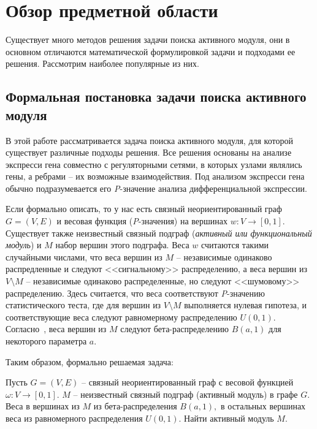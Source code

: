 \chapter{Обзор предметной области}
\label{section_module}

Существует много методов решения задачи поиска активного модуля, они в основном
отличаются математической формулировкой задачи и подходами ее решения.
Рассмотрим наиболее популярные из них.





\section{Формальная постановка задачи поиска активного модуля}

В этой работе рассматривается задача поиска активного модуля, для которой
существует различные подходы решения.  Все решения основаны на анализе
экспресси гена совместно с регуляторными сетями, в которых узлами являлись
гены, а ребрами -- их возможные взаимодействия. Под анализом экспресси гена
обычно подразумевается его \emph{P}-значение анализа дифференциальной
экспрессии.

Если формально описать, то у нас есть связный неориентированный граф $G = (V,
E)$ и весовая функция (\emph{P}-значения) на вершинах $w: V \to [0, 1]$.
Существует также неизвестный связный подграф (\emph{активный или функциональный
модуль}) и $M$ набор вершин этого подграфа.  Веса $w$ считаются такими
случайными числами, что веса вершин из $M$ -- независимые одинаково
распредленные и следуют <<сигнальному>> распределению, а веса вершин из $V
\setminus M$ -- независимые одинаково распределенные, но следуют <<шумовому>>
распределению.  Здесь считается, что веса соответствуют \emph{P}-значению
статистического теста, где для вершин из $V \setminus M$ выполняется нулевая
гипотеза, и соответствующие веса следуют равномерному распределению $U(0, 1)$.
Согласно~\cite{Dittrich2008a}, веса вершин из $M$ следуют бета-распределению
$B(a, 1)$ для некоторого параметра $a$.

Таким образом, формально решаемая задача:
\begin{problem}
    Пусть $G=(V, E)$ -- связный неориентированный граф с весовой функцией
    $\omega : V \to [0, 1].$ $M$ -- неизвестный связный подграф (активный
    модуль) в графе $G.$ Веса в вершинах из $M$ из бета-распределения $B(a,
    1),$ в остальных вершинах веса из равномерного распределения $U(0, 1).$
      Найти активный модуль $M$.
\end{problem}





